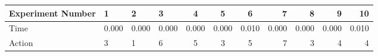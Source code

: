 \documentclass[8pt]{article}
\begin{document}
\begin{landscape}
\begin{tabular}{ | l | l | l | l | c | c | c | r | r | r | r | }
 \hline 
Experiment Number & 1 & 2 & 3 & 4 & 5 & 6 & 7 & 8 & 9 & 10\\ \hline
Time & 0.000 & 0.000 & 0.000 & 0.000 & 0.000 & 0.010 & 0.000 & 0.000 & 0.000 & 0.010\\ \hline
Action & 3 & 1 & 6 & 5 & 3 & 5 & 7 & 3 & 4 & 4\\ \hline\end{tabular}
\end{landscape}
\end{document}
